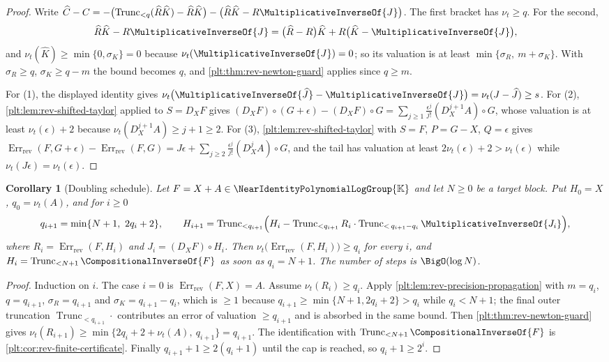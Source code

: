 \documentclass[11pt,oneside]{article}
\theoremstyle{plain}
\newtheorem{corollary}[theorem]{Corollary}
\theoremstyle{definition}
\theoremstyle{remark}
\newcommand{\K}{\mathbb{K}}
\newcommand{\Gnear}{\NearIdentityPolynomialLogGroup{\K}} %
\newcommand{\ordt}{\nu_{t}}                              %
\newcommand{\Trunc}[2]{\operatorname{Trunc}_{<#2}#1}     %
\newcommand{\DX}{D_{X}}                                  %
\newcommand{\compose}{\mathbin{\circ}}
\newcommand{\rev}[1]{\CompositionalInverseOf{#1}}
\newcommand{\RevErr}[2]{\operatorname{Err}_{\mathrm{rev}}\!\left(#1,#2\right)}
\begin{document}
\begin{proof}
Write
\(\widehat C-C=-\bigl(\Trunc{(\widehat R\widehat K)}{q}-\widehat R\widehat K\bigr)
-\bigl(\widehat R\widehat K-R\MultiplicativeInverseOf{J}\bigr)\).  The first
bracket has \(\ordt\ge q\).  For the second,
\[
 \widehat R\widehat K-R\MultiplicativeInverseOf{J}
 =\bigl(\widehat R-R\bigr)\widehat K
 +R\bigl(\widehat K-\MultiplicativeInverseOf{J}\bigr),
\]
and \(\ordt(\widehat K)\ge\min\{0,\sigma_K\}=0\) because
\(\ordt(\MultiplicativeInverseOf{J})=0\); so its valuation is at least
\(\min\{\sigma_R,\ m+\sigma_K\}\).  With \(\sigma_R\ge q\), \(\sigma_K\ge q-m\)
the bound becomes \(q\), and \cref{plt:thm:rev-newton-guard} applies since
\(q\ge m\).

For (1), the displayed identity gives
\(\ordt\bigl(\MultiplicativeInverseOf{\widehat J}
-\MultiplicativeInverseOf{J}\bigr)=\ordt(J-\widehat J)\ge s\).  For (2),
\cref{plt:lem:rev-shifted-taylor} applied to \(S=\DX F\) gives
\((\DX F)\compose(G+\epsilon)-(\DX F)\compose G
=\sum_{j\ge1}\frac{\epsilon^j}{j!}(\DX^{j+1}A)\compose G\), whose valuation is
at least \(\ordt(\epsilon)+2\) because \(\ordt(\DX^{j+1}A)\ge j+1\ge2\).  For
(3), \cref{plt:lem:rev-shifted-taylor} with \(S=F\), \(P=G-X\),
\(Q=\epsilon\) gives \(\RevErr{F}{G+\epsilon}-\RevErr{F}{G}
=J\epsilon+\sum_{j\ge2}\frac{\epsilon^j}{j!}(\DX^jA)\compose G\), and the tail
has valuation at least \(2\ordt(\epsilon)+2>\ordt(\epsilon)\) while
\(\ordt(J\epsilon)=\ordt(\epsilon)\).
\end{proof}

\begin{corollary}[Doubling schedule]
\label{plt:cor:rev-newton-schedule}
Let \(F=X+A\in\Gnear\) and let \(N\ge0\) be a target block.  Put \(H_0=X\),
\(q_0=\ordt(A)\), and for \(i\ge0\)
\[
 q_{i+1}=\min\{N+1,\ 2q_i+2\},
 \qquad
 H_{i+1}=\Trunc{\Bigl(H_i
   -\Trunc{R_i}{q_{i+1}}\cdot
    \Trunc{\MultiplicativeInverseOf{J_i}}{\,q_{i+1}-q_i}\Bigr)}{q_{i+1}},
\]
where \(R_i=\RevErr{F}{H_i}\) and \(J_i=(\DX F)\compose H_i\).
Then \(\ordt\bigl(\RevErr{F}{H_i}\bigr)\ge q_i\) for every \(i\), and
\(H_i=\Trunc{\rev{F}}{N+1}\) as soon as \(q_i=N+1\).  The number of steps
is \(\BigO(\log N)\).
\end{corollary}

\begin{proof}
Induction on \(i\).  The case \(i=0\) is \(\RevErr{F}{X}=A\).  Assume
\(\ordt(R_i)\ge q_i\).  Apply
\cref{plt:lem:rev-precision-propagation} with \(m=q_i\), \(q=q_{i+1}\),
\(\sigma_R=q_{i+1}\) and \(\sigma_K=q_{i+1}-q_i\), which is \(\ge1\) because
\(q_{i+1}\ge\min\{N+1,2q_i+2\}>q_i\) while \(q_i<N+1\); the final outer
truncation \(\Trunc{\cdot}{q_{i+1}}\) contributes an error of valuation
\(\ge q_{i+1}\) and is absorbed in the same bound.  Then
\cref{plt:thm:rev-newton-guard} gives
\(\ordt(R_{i+1})\ge\min\{2q_i+2+\ordt(A),\ q_{i+1}\}=q_{i+1}\).  The
identification with \(\Trunc{\rev{F}}{N+1}\) is
\cref{plt:cor:rev-finite-certificate}.  Finally \(q_{i+1}+1\ge2(q_i+1)\) until
the cap is reached, so \(q_i+1\ge2^i\).
\end{proof}
\end{document}
